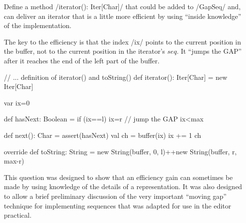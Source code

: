 \documentclass{ip3}
\begin{document}
\begin{foil}
\begin{exercise}
Define a method \sc/iterator(): Iter[Char]/ that could be added to \sc/GapSeq/ and,
can deliver an iterator that is a little more efficient by using ``inside knowledge''
of the implementation.
\begin{answer}

The key to the efficiency is that the index \sc/ix/ points to
the current position in the buffer, not to the current position
in the iterator's $seq$. It ``jumps the GAP'' after it reaches
the end of the left part of the buffer.

\begin{--code}
    // ... definition of iterator() and toString()
    def iterator(): Iter[Char] = new Iter[Char] {
        var ix=0
        
        def hasNext: Boolean = {
          if (ix==l) ix=r               // jump the GAP
          ix<max
        }
        
        def next(): Char = {
            assert(hasNext)
            val ch = buffer(ix)
            ix += 1
            ch
        }
    }
           
    override def toString: String = new String(buffer, 0, l)++new String(buffer, r, max-r) 
            
\end{--code} 

This question was designed to show that an efficiency gain can sometimes be
made by using knowledge of the details of a representation. It was also
designed to allow a brief preliminary discussion of the very important ``moving gap''
technique for implementing sequences that was adapted for use in the 
editor practical.
\end{answer} 
\end{exercise}
\end{foil}
\end{document}
